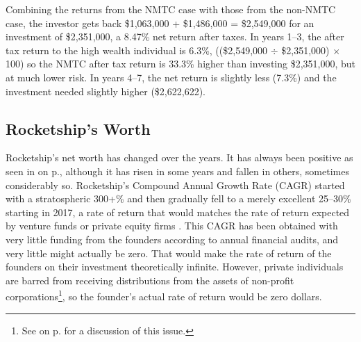 Combining the returns from the NMTC case with those from the non-NMTC case, the investor gets back \$1,063,000 + \$1,486,000 = \$2,549,000 for an investment of \$2,351,000, a 8.47\% net return after taxes. In years 1–3, the after tax return to the high wealth individual is 6.3\%, ((\$2,549,000 $÷$ \$2,351,000) $×$ 100) so the NMTC after tax return is 33.3\% higher than investing \$2,351,000, but at much lower risk. In years 4–7, the net return is slightly less (7.3\%) and the investment needed slightly higher (\$2,622,622).

\subsection{Rocketship's Worth}%
\label{sec:rocketship-worth}\indent%

Rocketship's net worth has changed over the years. It has always been positive as seen in  on p.\pageref{tab:net_assets_annual_change}, although it has risen in some years and fallen in others, sometimes considerably so. Rocketship's Compound Annual Growth Rate (CAGR) started with a stratospheric 300+\% and then gradually fell to a merely excellent 25–30\% starting in 2017, a rate of return that would matches the rate of return expected by venture funds or private equity firms \parencite[87]{Lord.Mirabile2018}. This CAGR has been obtained with very little funding from the founders according to annual financial audits, and very little might actually be zero. That would make the rate of return of the founders on their investment theoretically infinite. However, private individuals are barred from receiving distributions from the assets of non-profit corporations\footnote{See  on p.\pageref{sec:answ-rese-quest} for a discussion of this issue.}, so the founder's actual rate of return would be zero dollars.

